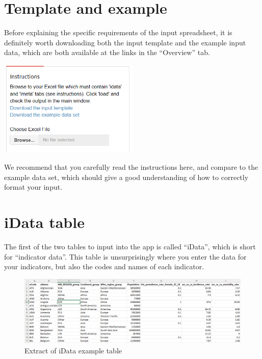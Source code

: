 \documentclass[
  letterpaper,
  DIV=11,
  numbers=noendperiod]{scrreprt}
\begin{document}
\hypertarget{template-and-example}{%
\section{Template and example}\label{template-and-example}}

Before explaining the specific requirements of the input spreadsheet, it
is definitely worth downloading both the input template and the example
input data, which are both available at the links in the ``Overview''
tab.

\includegraphics[width=0.5\textwidth,height=\textheight]{figs/data_input_1.png}

We recommend that you carefully read the instructions here, and compare
to the example data set, which should give a good understanding of how
to correctly format your input.

\hypertarget{idata-table}{%
\section{iData table}\label{idata-table}}

The first of the two tables to input into the app is called ``iData'',
which is short for ``indicator data''. This table is unsurprisingly
where you enter the data for your indicators, but also the codes and
names of each indicator.

\begin{figure}

{\centering \includegraphics[width=1\textwidth,height=\textheight]{figs/data_input_2.png}

}

\caption{Extract of iData example table}

\end{figure}
\end{document}
